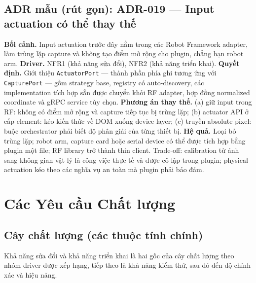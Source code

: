 \documentclass[11pt,a4paper]{report}
\newcommand{\code}[1]{\texttt{#1}}
\begin{document}
\section{ADR mẫu (rút gọn): ADR-019 --- Input actuation có thể thay thế}
\textbf{Bối cảnh.} Input actuation trước đây nằm trong các Robot Framework adapter,
làm trùng lặp capture và không tạo điểm mở rộng cho plugin, chẳng hạn robot arm.
\textbf{Driver.} NFR1 (khả năng sửa đổi), NFR2 (khả năng triển khai).
\textbf{Quyết định.} Giới thiệu \code{ActuatorPort} --- thành phần phía ghi tương ứng
với \code{CapturePort} --- gồm strategy base, registry có auto-discovery, các
implementation tích hợp sẵn được chuyển khỏi RF adapter, hợp đồng normalized coordinate
và gRPC service tùy chọn. \textbf{Phương án thay thế.} (a) giữ input trong RF: không có
điểm mở rộng và capture tiếp tục bị trùng lặp; (b) actuator API ở cấp element: kéo kiến
thức về DOM xuống device layer; (c) truyền absolute pixel: buộc orchestrator phải biết
độ phân giải của từng thiết bị. \textbf{Hệ quả.} Loại bỏ trùng lặp; robot arm, capture
card hoặc serial device có thể được tích hợp bằng plugin một file; RF library trở thành
thin client. Trade-off: calibration từ ảnh sang không gian vật lý là công việc thực tế
và được cô lập trong plugin; physical actuation kéo theo các nghĩa vụ an toàn mà plugin
phải bảo đảm.

\chapter{Các Yêu cầu Chất lượng}
\section{Cây chất lượng (các thuộc tính chính)}
Khả năng sửa đổi và khả năng triển khai là hai gốc của cây chất lượng theo nhóm driver
được xếp hạng, tiếp theo là khả năng kiểm thử, sau đó đến độ chính xác và hiệu năng.
\end{document}
